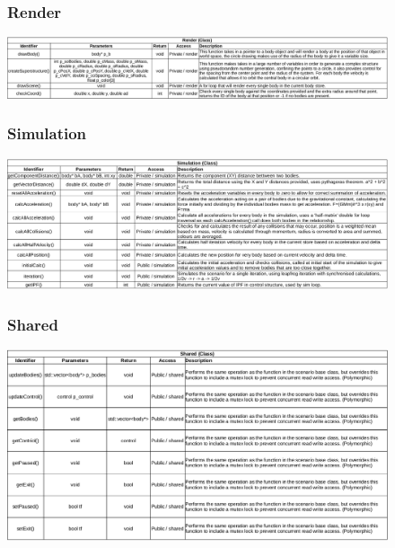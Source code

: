 \begin{figure}
  \subsubsection{Render}
  \centering  
  \includegraphics[width=\textwidth]{img/functions/render.png}
\end{figure}

\begin{figure}
  \subsubsection{Simulation}
  \centering  
  \includegraphics[width=\textwidth]{img/functions/simulation.png}
\end{figure}

\begin{figure}
  \subsubsection{Shared}
  \centering  
  \includegraphics[width=\textwidth]{img/functions/shared.png}
\end{figure}

